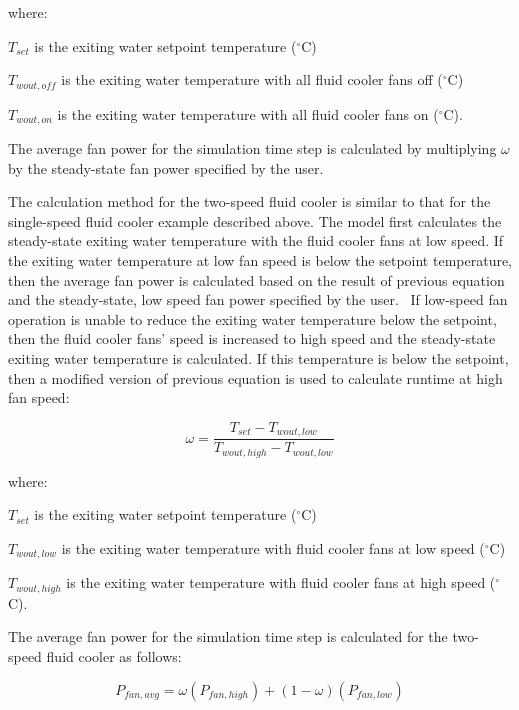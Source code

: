 where:

\({T_{set}}\) is the exiting water setpoint temperature (\(^{\circ}\)C)

\({T_{wout,off}}\) is the exiting water temperature with all fluid cooler fans off (\(^{\circ}\)C)

\({T_{wout,on}}\) is the exiting water temperature with all fluid cooler fans on (\(^{\circ}\)C).

The average fan power for the simulation time step is calculated by multiplying \(\omega\) by the steady-state fan power specified by the user.

The calculation method for the two-speed fluid cooler is similar to that for the single-speed fluid cooler example described above. The model first calculates the steady-state exiting water temperature with the fluid cooler fans at low speed. If the exiting water temperature at low fan speed is below the setpoint temperature, then the average fan power is calculated based on the result of previous equation and the steady-state, low speed fan power specified by the user.~ If low-speed fan operation is unable to reduce the exiting water temperature below the setpoint, then the fluid cooler fans' speed is increased to high speed and the steady-state exiting water temperature is calculated. If this temperature is below the setpoint, then a modified version of previous equation is used to calculate runtime at high fan speed:

\begin{equation}
\omega = \frac{{{T_{set}} - {T_{wout,low}}}}{{{T_{wout,high}} - {T_{wout,low}}}}
\end{equation}

where:

\({T_{set}}\) is the exiting water setpoint temperature (\(^{\circ}\)C)

\({T_{wout,low}}\) is the exiting water temperature with fluid cooler fans at low speed (\(^{\circ}\)C)

\({T_{wout,high}}\) is the exiting water temperature with fluid cooler fans at high speed (\(^{\circ}\)C).

The average fan power for the simulation time step is calculated for the two-speed fluid cooler as follows:

\begin{equation}
{P_{fan,avg}} = \omega ({P_{fan,high}}) + \left( {1 - \omega } \right)\left( {{P_{fan,low}}} \right)
\end{equation}
